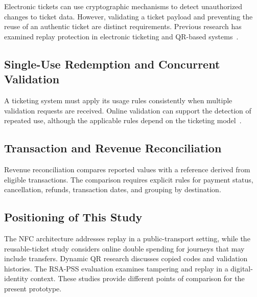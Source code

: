 \documentclass[runningheads]{llncs}
\begin{document}
Electronic tickets can use cryptographic mechanisms to detect
unauthorized changes to ticket data. However, validating a ticket
payload and preventing the reuse of an authentic ticket are distinct
requirements. Previous research has examined replay protection in
electronic ticketing and QR-based systems~\cite{ref_nfc_ticketing,
ref_dynamic_qr,ref_qr_security}.


\subsection{Single-Use Redemption and Concurrent Validation}

A ticketing system must apply its usage rules consistently when
multiple validation requests are received. Online validation can
support the detection of repeated use, although the applicable rules
depend on the ticketing model~\cite{ref_reusable_ticket}.


\subsection{Transaction and Revenue Reconciliation}

Revenue reconciliation compares reported values with a reference
derived from eligible transactions. The comparison requires explicit
rules for payment status, cancellation, refunds, transaction dates,
and grouping by destination.


\subsection{Positioning of This Study}

The NFC architecture addresses replay in a public-transport setting,
while the reusable-ticket study considers online double spending for
journeys that may include transfers. Dynamic QR research discusses
copied codes and validation histories. The RSA-PSS evaluation examines
tampering and replay in a digital-identity context. These studies
provide different points of comparison for the present prototype.
\end{document}
